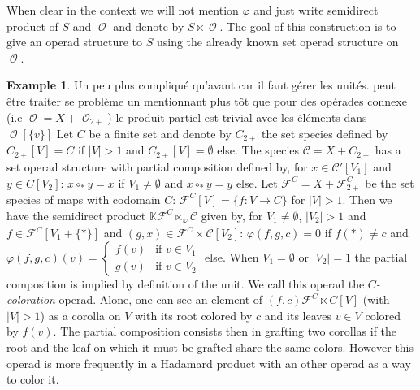 \documentclass[a4paper]{article}
\DeclareMathOperator{\op}{\mathcal{O}}
\theoremstyle{definition}
\newtheorem{definition}{Definition}
\newtheorem{example}[definition]{Example}
\newcommand{\K}{\mathbb{K}}
\begin{document}
When clear in the context we will not mention $\varphi$ and just write 
semidirect product of $S$ and $\op$ and denote by $S\ltimes \op$. The 
goal of this construction is to give an operad structure to $S$ using 
the already known set operad structure on $\op$.

\begin{example}
{\color{red} Un peu plus compliqué qu'avant car il faut gérer les unités. peut être traiter se problème un mentionnant plus tôt que pour des opérades connexe (i.e $\op = X+\op_{2+}$) le produit partiel est trivial avec les éléments dans $\op[\{v\}]$}
Let $C$ be a finite set and denote by $C_{2+}$ the set species defined by 
$C_{2+}[V] = C$ if $|V|>1$ and $C_{2+}[V] = \emptyset$ else. The species 
$\mathcal{C}=X+C_{2+}$ has a set operad structure with partial composition 
defined by, for $x\in \mathcal{C}'[V_1]$ and $y\in C[V_2]$: $x\circ_{\ast} y = x$ 
if $V_1\not = \emptyset$ and $x\circ_{\ast} y = y$ else. Let $\mathcal{F}^C = X + 
\mathcal{F}_{2+}^C$ be the set species of maps with codomain $C$: 
$\mathcal{F}^C[V]=\{f:V\rightarrow C\}$ for $|V| > 1$. Then we have the 
semidirect product $\K\mathcal{F}^C\ltimes_{\varphi} \mathcal{C}$ given by, 
for $V_1\not = \emptyset$, $|V_2|>1$ and $f\in \mathcal{F}^C[V_1+\{\ast\}]$
 and $(g,x)\in \mathcal{F}^C\times \mathcal{C}[V_2]$: $\varphi(f,g,c) = 0$ 
 if $f(\ast) \not = c$ and $\varphi(f,g,c)(v) = \left\{\begin{array}{rl}
f(v)  & \text{if $v\in V_1$}    \\ 
g(v)  & \text{if $v\in V_2$}\end{array}\right.$ else. When $V_1=\emptyset$ 
or $|V_2|=1$ the partial composition is implied by definition of the unit. 
We call this operad the \textit{$C$-coloration} operad. Alone, one can see 
an element of $(f,c)\mathcal{F}^C\ltimes C[V]$ (with $|V|>1$) as a corolla 
on $V$ with its root colored by $c$ and its leaves $v\in V$ colored by $f(v)$. 
The partial composition consists then in grafting two corollas if the root and 
the leaf on which it must be grafted share the same colors. However this operad is 
more frequently in a Hadamard product with an other operad as a way to color it. 
\end{example}

\end{document}
